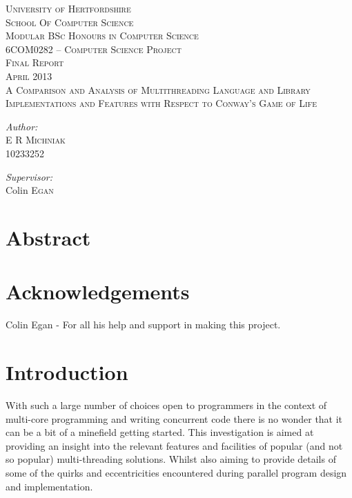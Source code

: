 \documentclass[11pt]{article} %
\begin{document}
\begin{titlepage}
\begin{center}
\textsc{\LARGE University of Hertfordshire}\\[0.5cm]
\textsc{\Large School Of Computer Science}\\[1.5cm]
\textsc{\Large Modular BSc Honours in Computer Science}\\[1.5cm]
\textsc{\Large 6COM0282 – Computer Science Project}\\[3cm]
\textsc{\Large Final Report}\\[0.5cm]
\textsc{\Large April 2013}\\[3.5cm]
\textsc{\Large A Comparison and Analysis of Multithreading Language and Library Implementations and Features with Respect to Conway's Game of Life}\\[0.5cm]
\vfill
\begin{minipage}{0.4\textwidth}
\begin{flushleft} \large
\emph{Author:}\\
E R \textsc{Michniak} \\ 10233252
\end{flushleft}
\end{minipage}
\begin{minipage}{0.4\textwidth}
\begin{flushright} \large
\emph{Supervisor:} \\
Colin \textsc{Egan} \\
\end{flushright}
\end{minipage}
\end{center}
\end{titlepage}

\pagebreak
\tableofcontents
\pagebreak
\section{Abstract}
\pagebreak
\section{Acknowledgements}
Colin Egan - For all his help and support in making this project.
\pagebreak
\section{Introduction}
With such a large number of choices open to programmers in the context of multi-core programming and writing concurrent code there is no wonder that it can be a bit of a minefield getting started. This investigation is aimed at providing an insight into the relevant features and facilities of popular (and not so popular) multi-threading solutions. Whilst also aiming to provide details of some of the quirks and eccentricities encountered during parallel program design and implementation.
\end{document}
